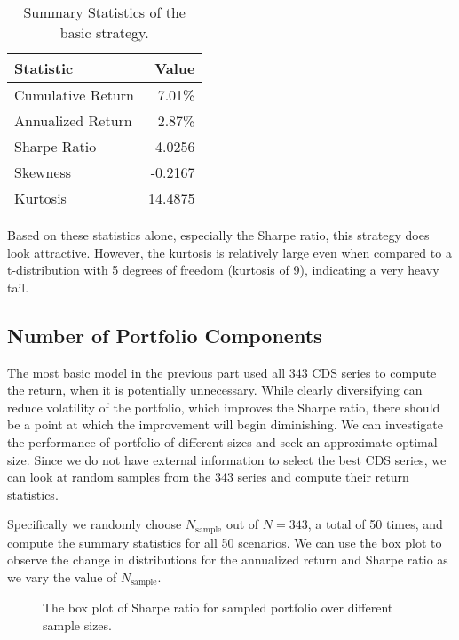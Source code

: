 \documentclass[11pt]{article}
\theoremstyle{definition}
\begin{document}
\begin{table}[h]
\centering
\begin{tabular}{ | l | r | }
  \hline      
  Statistic & Value \\
  \hline
  Cumulative Return & 7.01\% \\
  Annualized Return & 2.87\% \\
  Sharpe Ratio & 4.0256 \\
  Skewness & -0.2167 \\
  Kurtosis & 14.4875 \\
  \hline  
\end{tabular}
\caption{Summary Statistics of the basic strategy.}
\label{tab:basic_summary}
\end{table}

Based on these statistics alone, especially the Sharpe ratio, 
this strategy does look attractive. 
However, the kurtosis is relatively large
even when compared to a t-distribution with 5 degrees of freedom
(kurtosis of 9),
indicating a very heavy tail.

\subsection{Number of Portfolio Components}

The most basic model in the previous part 
used all 343 CDS series to 
compute the return, when it is potentially unnecessary.
While clearly diversifying can reduce volatility 
of the portfolio, which improves the Sharpe ratio,
there should be a point at which the improvement 
will begin diminishing.
We can investigate the performance of portfolio 
of different sizes and seek an approximate 
optimal size.
Since we do not have external information to 
select the best CDS series,
we can look at random samples from the 343 series 
and compute their return statistics.

Specifically we randomly choose $N_\text{sample}$ out of 
$N = 343$, a total of 50 times,
and compute the summary statistics for all 50 scenarios.
We can use the box plot to observe the change in 
distributions for the annualized return and Sharpe ratio
as we vary the value of $N_\text{sample}$.

\begin{figure}[h]
\begin{center}
\end{center}
\centering
\caption{\label{fg:boxplot_sharpe}
The box plot of Sharpe ratio for sampled portfolio
over different sample sizes.
}
\end{figure}
\end{document}
